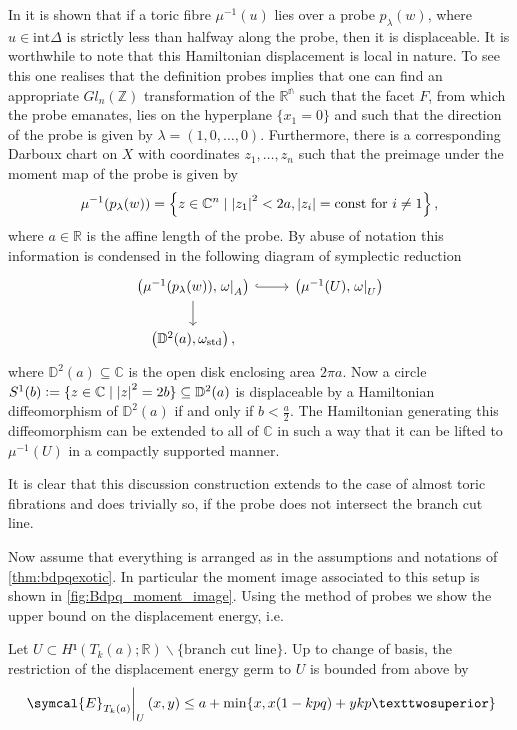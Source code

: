 \documentclass[12pt,a4paper,draft]{scrartcl}
\begin{document}
In \cite[Lemma 2.4.]{mcduff2011displacing} it is shown that if a toric fibre $\mu^{-1}(u)$ lies over a probe $p_\lambda(w)$, where $u\in \text{int}\Delta$ is strictly less than halfway along the probe, then it is displaceable.
It is worthwhile to note that this Hamiltonian displacement is local in nature.
To see this one realises that the definition probes implies that one can find an appropriate $Gl_n(\mathbb{Z})$ transformation of the $\mathbb{R^n}$ such that the facet $F$, from which the probe emanates, lies on the hyperplane $\{x_1=0\}$ and such that the direction of the probe is given by $\lambda=(1,0,\ldots,0)$.
Furthermore, there is a corresponding Darboux chart on $X$ with coordinates $z_1,\ldots,z_n$ such that the preimage under the moment map of the probe is given by
\begin{equation*}
  \mu^{-1}(p_\lambda(w))=\left\{z\in \mathbb{C}^n \mid \abs{z_1}^2<2a, \abs{z_i}=\text{const for }i\neq 1\right\},
\end{equation*}
where $a \in \mathbb{R}$ is the affine length of the probe.
By abuse of notation this information is condensed in the following diagram of symplectic reduction
\[
\begin{tikzcd}
  \left(\mu^{-1}(p_\lambda(w)),\left.\omega\right|_A\right)\ar[r,hook]\ar[d]&
  \left(\mu^{-1}(U),\left.\omega\right|_U\right)
  \\
  \left(\mathbb{D}^2(a),\omega_\text{std}\right),
\end{tikzcd}
\]
where $\mathbb{D}^2(a)\subseteq \mathbb{C}$ is the open disk enclosing area $2\pi a$.
Now a circle $S^1(b)\vcentcolon=\{z\in \mathbb{C}\mid \abs{z}^2=2b\} \subseteq \mathbb{D}^2(a)$ is displaceable by a Hamiltonian diffeomorphism of $\mathbb{D}^2(a)$ if and only if $b<\frac{a}{2}$.
The Hamiltonian generating this diffeomorphism can be extended to all of $\mathbb{C}$ in such a way that it can be lifted to $\mu^{-1}(U)$ in a compactly supported manner.

It is clear that this discussion construction extends to the case of almost toric fibrations and does trivially so, if the probe does not intersect the branch cut line.

Now assume that everything is arranged as in the assumptions and notations of \cref{thm:bdpqexotic}.
In particular the moment image associated to this setup is shown in \cref{fig:Bdpq_moment_image}.
Using the method of probes we show the upper bound on the displacement energy, i.e.


\begin{lemma}
    \label{thm:upper_bound}
  Let $U ⊂ H¹(T_k(a);ℝ) ∖ \{\text{branch cut line}\}$.
  Up to change of basis, the restriction of the displacement energy germ to $U$ is bounded from above by
  \[ \eval{\symcal{E}_{T_k(a)}}_U (x,y) \leq a+\min\{x,x(1-kpq)+ykp²\} \]
\end{lemma}
\end{document}
